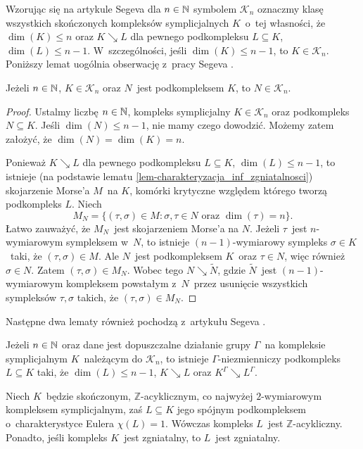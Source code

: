 Wzorując się na artykule Segeva \cite{Segev94} dla $n\in\mathbb{N}$ symbolem $\mathscr{K}_n$ oznaczmy klasę wszystkich skończonych kompleksów symplicjalnych $K$~o~tej własności, że $\dim(K)\leq n$ oraz $K\searrow L$ dla pewnego podkompleksu $L\subseteq K$, $\dim(L)\leq n-1$. W~szczególności, jeśli $\dim(K)\leq n-1$, to $K\in\mathscr{K}_n$. Poniższy lemat uogólnia obserwację z~pracy Segeva \cite[(3.6)]{Segev94}.

\begin{lem}\label{lem-podkompleks_Kn_jest_w_Kn}
Jeżeli $n\in\mathbb{N}$, $K\in\mathscr{K}_n$ oraz $N$~jest podkompleksem $K$, to $N\in \mathscr{K}_n$.
\end{lem}
\begin{proof}
Ustalmy liczbę $n\in\mathbb{N}$, kompleks symplicjalny $K\in\mathscr{K}_n$ oraz podkompleks $N\subseteq K$. Jeśli \mbox{$\dim(N)\leq n-1$}, nie mamy czego dowodzić. Możemy zatem założyć, że $\dim(N)=\dim(K)=n$. 

Ponieważ $K\searrow L$ dla pewnego podkompleksu $L\subseteq K$, $\dim(L)\leq n-1$, to istnieje (na podstawie lematu \ref{lem-charakteryzacja_inf_zgniatalnosci}) skojarzenie Morse'a $M$~na $K$, komórki krytyczne względem którego tworzą podkompleks $L$. Niech \[M_N=\{(\tau,\sigma)\in M:\sigma,\tau\in N \text{ oraz } \dim(\tau)=n\}.\] Łatwo zauważyć, że $M_N$~jest skojarzeniem Morse'a na $N$. Jeżeli $\tau$~jest \mbox{$n$-wymiarowym} sympleksem w~$N$, to istnieje \mbox{$(n-1)$-wymiarowy} sympleks \mbox{$\sigma\in K$}~taki, że $(\tau,\sigma)\in M$. Ale $N$~jest podkompleksem $K$~oraz \mbox{$\tau\in N$}, więc również \mbox{$\sigma\in N$}. Zatem $(\tau,\sigma)\in M_N$. Wobec tego $N\searrow \tilde{N}$, gdzie $\tilde{N}$~jest \mbox{$(n-1)$-wymiarowym} kompleksem powstałym z~$N$~przez usunięcie wszystkich sympleksów $\tau,\sigma$ takich, że $(\tau,\sigma)\in M_N$.
\end{proof}

Następne dwa lematy również pochodzą z~artykułu Segeva \cite{Segev94}.

\begin{lem}\label{lem-segev_Kn_i_podkompleks_G_niezmienniczy}
Jeżeli $n\in \mathbb{N}$ oraz dane jest dopuszczalne działanie grupy $\Gamma$~na kompleksie symplicjalnym $K$~należącym do $\mathscr{K}_n$, to istnieje \mbox{$\Gamma$-niezmienniczy} podkompleks $L\subseteq K$ taki, że $\dim(L)\leq n-1$, $K\searrow L$ oraz $K^\Gamma\searrow L^\Gamma$.
\end{lem}

\begin{lem}\label{lem-segev_podkompleks_2wymiarowego_acyklicznego}
Niech $K$~będzie skończonym, $\mathbb{Z}$-acyklicznym, co najwyżej \mbox{$2$-wymiarowym} kompleksem symplicjalnym, zaś $L\subseteq K$ jego spójnym podkompleksem o~charakterystyce Eulera $\chi(L)=1$. Wówczas kompleks $L$~jest $\mathbb{Z}$-acykliczny. Ponadto, jeśli kompleks $K$~jest zgniatalny, to $L$~jest zgniatalny.
\end{lem}

